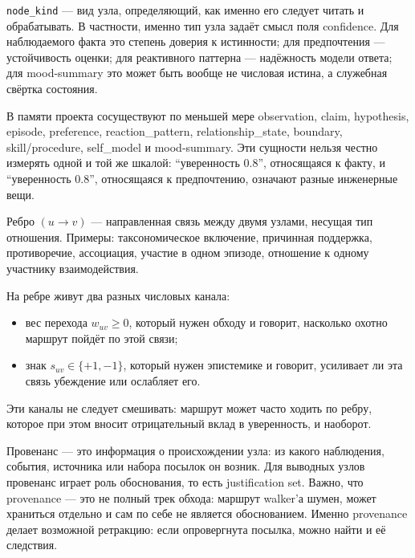 \begin{definition}
\texttt{node\_kind} --- вид узла, определяющий, как именно его следует читать и
обрабатывать. В частности, именно тип узла задаёт смысл поля confidence. Для
наблюдаемого факта это степень доверия к истинности; для предпочтения ---
устойчивость оценки; для реактивного паттерна --- надёжность модели ответа;
для mood-summary это может быть вообще не числовая истина, а служебная
свёртка состояния.
\end{definition}

\begin{pitfall}
В памяти проекта сосуществуют по меньшей мере observation, claim, hypothesis,
episode, preference, reaction\_pattern, relationship\_state, boundary,
skill/procedure, self\_model и mood-summary. Эти сущности нельзя честно
измерять одной и той же шкалой: ``уверенность 0.8'', относящаяся к факту, и
``уверенность 0.8'', относящаяся к предпочтению, означают разные инженерные
вещи.
\end{pitfall}

\begin{definition}[Ребро]
Ребро $(u \to v)$ --- направленная связь между двумя узлами, несущая тип
отношения. Примеры: таксономическое включение, причинная поддержка,
противоречие, ассоциация, участие в одном эпизоде, отношение к одному
участнику взаимодействия.
\end{definition}

\begin{definition}
На ребре живут два разных числовых канала:
\begin{itemize}
\item вес перехода $w_{uv} \ge 0$, который нужен обходу и говорит, насколько охотно маршрут пойдёт по этой связи;
\item знак $s_{uv} \in \{+1, -1\}$, который нужен эпистемике и говорит, усиливает ли эта связь убеждение или ослабляет его.
\end{itemize}
Эти каналы не следует смешивать: маршрут может часто ходить по ребру, которое
при этом вносит отрицательный вклад в уверенность, и наоборот.
\end{definition}

\begin{definition}
Провенанс --- это информация о происхождении узла: из какого наблюдения,
события, источника или набора посылок он возник. Для выводных узлов
провенанс играет роль обоснования, то есть justification set. Важно, что
provenance --- это не полный трек обхода: маршрут walker'а шумен, может
храниться отдельно и сам по себе не является обоснованием. Именно provenance
делает возможной ретракцию: если опровергнута посылка, можно найти и её
следствия.
\end{definition}


